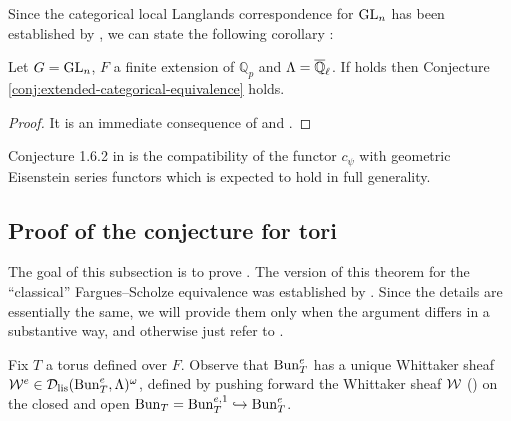 Since the categorical local Langlands correspondence for $\mathrm{GL}_n$ has been established by \cite{HansenMann26}, we can state the following corollary : 
\begin{corol}
    Let $G = \mathrm{GL}_n$, $F$ a finite extension of $\mathbb{Q}_p$ and $\Lambda = \overline{\mathbb{Q}}_{\ell}$. If \cite[Conjecture 1.6.2]{HansenMann26} holds then Conjecture \ref{conj:extended-categorical-equivalence} holds. 
\end{corol}

\begin{proof}
    It is an immediate consequence of \cite[Theorem 1.1.1]{HansenMann26} and .
\end{proof}

\begin{rque}
    Conjecture 1.6.2 in \cite{HansenMann26} is the compatibility of the functor $c_{\psi}$ with geometric Eisenstein series functors which is expected to hold in full generality. 
\end{rque}

\subsection{Proof of the conjecture for tori}\label{sec:case-of-tori}

The goal of this subsection is to prove . The version of this theorem for the ``classical'' Fargues--Scholze equivalence was established by \cite{Zou24}. Since the details are essentially the same, we will provide them only when the argument differs in a substantive way, and otherwise just refer to \cite{Zou24}.

Fix $T$ a torus defined over $F$. Observe that $\mathrm{Bun}_{T}^{e}$ has a unique Whittaker sheaf $\mathcal{W}^{e} \in \mathcal{D}_{\textnormal{lis}}(\mathrm{Bun}_{T}^{e},\Lambda)^{\omega}$, defined by pushing forward the Whittaker sheaf $\mathcal{W}$ (\cite[Definition 6.2.1]{Zou24}) on the closed and open $\mathrm{Bun}_{T} = \mathrm{Bun}_{T}^{e,1} \hookrightarrow \mathrm{Bun}_{T}^{e}$. 

